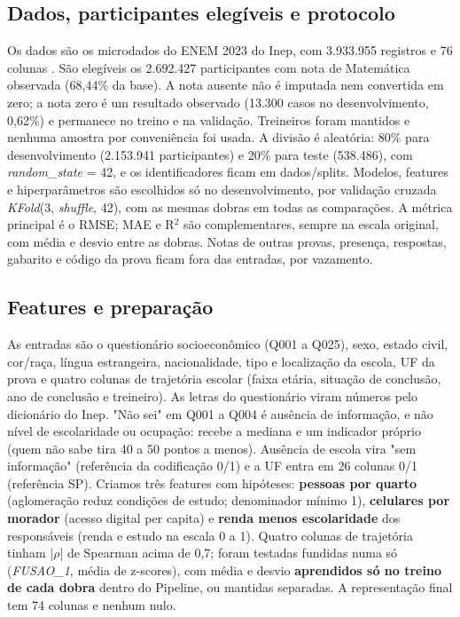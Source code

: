 \documentclass[conference,a4paper]{IEEEtran}
\begin{document}
\subsection{Dados, participantes elegíveis e protocolo}
Os dados são os microdados do ENEM 2023 do Inep, com 3.933.955 registros e 76 colunas \cite{inep}. São elegíveis os 2.692.427 participantes com nota de Matemática observada (68,44\% da base). A nota ausente não é imputada nem convertida em zero; a nota zero é um resultado observado (13.300 casos no desenvolvimento, 0,62\%) e permanece no treino e na validação. Treineiros foram mantidos e nenhuma amostra por conveniência foi usada. A divisão é aleatória: 80\% para desenvolvimento (2.153.941 participantes) e 20\% para teste (538.486), com \textit{random\_state} = 42, e os identificadores ficam em dados/splits. Modelos, features e hiperparâmetros são escolhidos só no desenvolvimento, por validação cruzada \textit{KFold}(3, \textit{shuffle}, 42), com as mesmas dobras em todas as comparações. A métrica principal é o RMSE; MAE e R$^2$ são complementares, sempre na escala original, com média e desvio entre as dobras. Notas de outras provas, presença, respostas, gabarito e código da prova ficam fora das entradas, por vazamento.


\subsection{Features e preparação}
As entradas são o questionário socioeconômico (Q001 a Q025), sexo, estado civil, cor/raça, língua estrangeira, nacionalidade, tipo e localização da escola, UF da prova e quatro colunas de trajetória escolar (faixa etária, situação de conclusão, ano de conclusão e treineiro). As letras do questionário viram números pelo dicionário do Inep. "Não sei" em Q001 a Q004 é ausência de informação, e não nível de escolaridade ou ocupação: recebe a mediana e um indicador próprio (quem não sabe tira 40 a 50 pontos a menos). Ausência de escola vira "sem informação" (referência da codificação 0/1) e a UF entra em 26 colunas 0/1 (referência SP). Criamos três features com hipóteses: \textbf{pessoas por quarto} (aglomeração reduz condições de estudo; denominador mínimo 1), \textbf{celulares por morador} (acesso digital per capita) e \textbf{renda menos escolaridade} dos responsáveis (renda e estudo na escala 0 a 1). Quatro colunas de trajetória tinham |$\rho$| de Spearman \cite{spearman} acima de 0,7; foram testadas fundidas numa só (\textit{FUSAO\_1}, média de z-scores), com média e desvio \textbf{aprendidos só no treino de cada dobra} dentro do Pipeline, ou mantidas separadas. A representação final tem 74 colunas e nenhum nulo.
\end{document}

